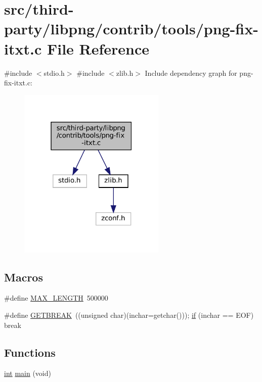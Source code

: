 \hypertarget{png-fix-itxt_8c}{}\section{src/third-\/party/libpng/contrib/tools/png-\/fix-\/itxt.c File Reference}
\label{png-fix-itxt_8c}
{\ttfamily \#include $<$stdio.\+h$>$}\newline
{\ttfamily \#include $<$zlib.\+h$>$}\newline
Include dependency graph for png-\/fix-\/itxt.c\+:
\nopagebreak
\begin{figure}[H]
\begin{center}
\leavevmode
\includegraphics[width=199pt]{png-fix-itxt_8c__incl}
\end{center}
\end{figure}
\subsection*{Macros}
\begin{DoxyCompactItemize}
\item 
\#define \mbox{\hyperlink{png-fix-itxt_8c_a7a9a231e30b47bc0345749c8bd1e5077}{M\+A\+X\+\_\+\+L\+E\+N\+G\+TH}}~500000
\item 
\#define \mbox{\hyperlink{png-fix-itxt_8c_ad3802e260bd2dc98294a5578bd0e361c}{G\+E\+T\+B\+R\+E\+AK}}~((unsigned char)(inchar=getchar())); \mbox{\hyperlink{isa-lr35902_8c_a2eb27369cb3dbac14564f95cd51effdf}{if}} (inchar == E\+OF) break
\end{DoxyCompactItemize}
\subsection*{Functions}
\begin{DoxyCompactItemize}
\item 
\mbox{\hyperlink{ioapi_8h_a787fa3cf048117ba7123753c1e74fcd6}{int}} \mbox{\hyperlink{png-fix-itxt_8c_a840291bc02cba5474a4cb46a9b9566fe}{main}} (void)
\end{DoxyCompactItemize}


